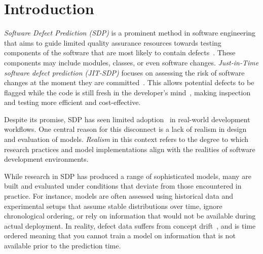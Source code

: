 \documentclass[\main/thesis.tex]{subfiles}
\begin{document}


\chapter{Introduction}

\label{chp:intro}
\textit{Software Defect Prediction (SDP)} is a prominent method in software engineering that aims to guide limited quality assurance resources towards testing components of the software that are most likely to contain defects~\cite{ostrand2004bugs}. These components may include modules, classes, or even software changes. \textit{Just-in-Time software defect prediction (JIT-SDP)} focuses on assessing the risk of software changes at the moment they are committed~\cite{kamei2012large}. This allows potential defects to be flagged while the code is still fresh in the developer's mind~\cite{EMSE6effortaware,huang2017supervised}, making inspection and testing more efficient and cost-effective.

Despite its promise, SDP has seen limited adoption~\cite{da2016framework,} in real-world development workflows. One central reason for this disconnect is a lack of realism in design and evaluation of models. \textit{Realism} in this context refers to the degree to which research practices and model implementations align with the realities of software development environments. %

While research in SDP has produced a range of sophisticated models, many are built and evaluated under conditions that deviate from those encountered in practice. For instance, models are often assessed using historical data and experimental setups that assume stable distributions over time, ignore chronological ordering, or rely on information that would not be available during actual deployment. In reality, defect data suffers from concept drift~\cite{wang2018systematic}, and is time ordered meaning that you cannot train a model on information that is not available prior to the prediction time. 
\end{document}
